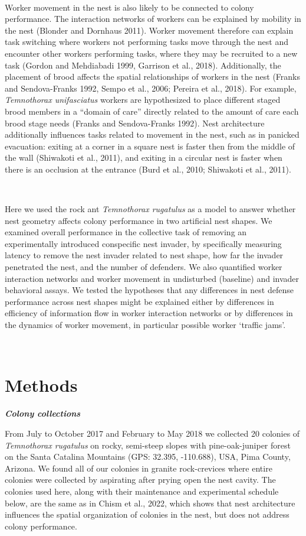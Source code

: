\documentclass[3p]{elsarticle} %
\begin{document}
~

Worker movement in the nest is also likely to be connected to colony
performance. The interaction networks of workers can be explained by
mobility in the nest (Blonder and Dornhaus 2011). Worker movement
therefore can explain task switching where workers not performing tasks
move through the nest and encounter other workers performing tasks,
where they may be recruited to a new task (Gordon and Mehdiabadi 1999,
Garrison et al., 2018). Additionally, the placement of brood affects the
spatial relationships of workers in the nest (Franks and Sendova-Franks
1992, Sempo et al., 2006; Pereira et al., 2018). For example,
\emph{Temnothorax unifasciatus} workers are hypothesized to place
different staged brood members in a ``domain of care'' directly related
to the amount of care each brood stage needs (Franks and Sendova-Franks
1992). Nest architecture additionally influences tasks related to
movement in the nest, such as in panicked evacuation: exiting at a
corner in a square nest is faster then from the middle of the wall
(Shiwakoti et al., 2011), and exiting in a circular nest is faster when
there is an occlusion at the entrance (Burd et al., 2010; Shiwakoti et
al., 2011).

~

Here we used the rock ant \emph{Temnothorax rugatulus} as a model to
answer whether nest geometry affects colony performance in two
artificial nest shapes. We examined overall performance in the
collective task of removing an experimentally introduced conspecific
nest invader, by specifically measuring latency to remove the nest
invader related to nest shape, how far the invader penetrated the nest,
and the number of defenders. We also quantified worker interaction
networks and worker movement in undisturbed (baseline) and invader
behavioral assays. We tested the hypotheses that any differences in nest
defense performance across nest shapes might be explained either by
differences in efficiency of information flow in worker interaction
networks or by differences in the dynamics of worker movement, in
particular possible worker `traffic jams'.

~

\hypertarget{methods}{%
\section{Methods}\label{methods}}

\textbf{\emph{Colony collections}}

From July to October 2017 and February to May 2018 we collected 20
colonies of \emph{Temnothorax rugatulus} on rocky, semi-steep slopes
with pine-oak-juniper forest on the Santa Catalina Mountains (GPS:
32.395, -110.688), USA, Pima County, Arizona. We found all of our
colonies in granite rock-crevices where entire colonies were collected
by aspirating after prying open the nest cavity. The colonies used here,
along with their maintenance and experimental schedule below, are the
same as in Chism et al., 2022, which shows that nest architecture
influences the spatial organization of colonies in the nest, but does
not address colony performance.
\end{document}
